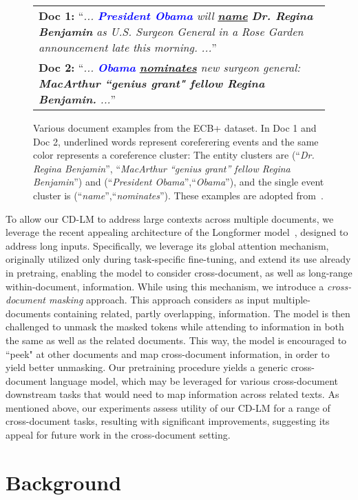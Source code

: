 \documentclass[11pt,a4paper]{article}
\begin{document}
\begin{figure}
    \centering
    \begin{tabular}{p{7cm}}
    \toprule
    \textbf{Doc 1: }``\emph{... \textbf{\textcolor{blue}{President Obama}} will \textbf{\underline{\textcolor{darkspringgreen}{name}}} \textbf{\textcolor{chamoisee}{Dr. Regina Benjamin}} as U.S. Surgeon General in a Rose Garden announcement late this morning. ...}''\\
    \textbf{Doc 2: }``\emph{... \textbf{\textcolor{blue}{Obama}} \textbf{\underline{\textcolor{darkspringgreen}{nominates}}} new surgeon general: \textbf{\textcolor{chamoisee}{MacArthur ``genius grant" fellow Regina Benjamin.}} ...}'' \\

    \bottomrule
    \end{tabular}
      \caption{Various document examples from the ECB+ dataset. In Doc 1 and Doc 2, underlined words represent coreferering events and the same color represents a coreference cluster: The entity clusters are (``\emph{Dr. Regina Benjamin}'', ``\emph{MacArthur “genius grant” fellow Regina Benjamin}'') and (``\emph{President Obama}'',``\emph{Obama}''), and the single event cluster is (``\emph{name}'',``\emph{nominates}''). These examples are adopted from~\citet{Cattan2020StreamliningCC}.}
    \label{fig:comb_coref_examples}
    \vspace{-3mm}
\end{figure} 
To allow our CD-LM to address large contexts across multiple documents, we leverage the recent appealing architecture of the Longformer model~\cite{beltagy2020longformer}, designed to address long inputs. Specifically, we leverage its global attention mechanism, originally utilized only during task-specific fine-tuning, and extend its use already in pretraing, enabling the model to consider cross-document, as well as long-range within-document, information. While using this mechanism, we introduce a \textit{cross-document masking} approach. This approach considers as input multiple-documents containing related, partly overlapping, information. The model is then challenged to unmask the masked tokens while attending to information in both the same as well as the related documents. This way, the model is encouraged to ``peek" at other documents and map cross-document information, in order to yield better unmasking. Our pretraining procedure yields a generic cross-document language model, which may be leveraged for various cross-document downstream tasks that would need to map information across related texts. As mentioned above, our experiments assess utility of our CD-LM for a range of cross-document tasks, resulting with significant improvements, suggesting its appeal for future work in the cross-document setting. \section{Background}
\end{document}
